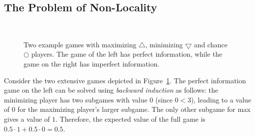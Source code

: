 \documentclass{aamas2015}
\begin{document}
\subsection{The Problem of Non-Locality}
\label{sec:non-locality}

\begin{figure}
\begin{center}
~~~
\end{center}
\caption{Two example games with maximizing $\bigtriangleup$, minimizing $\bigtriangledown$ and chance $\bigcirc$ players. The game of the left has perfect information, while the game on the right has imperfect information. \label{fig:coordGame}}
\end{figure}

Consider the two extensive games depicted in Figure~\ref{fig:coordGame}. The perfect information game on the left can be solved using {\it backward induction}
as follows: the minimizing player has two subgames with value 0 (since $0 < 3$), leading to a value of 0 for the maximizing player's larger subgame. The only other subgame for max gives a value of $1$. Therefore, the expected value of the full game is $0.5 \cdot 1 + 0.5 \cdot 0 = 0.5$.
\end{document}
